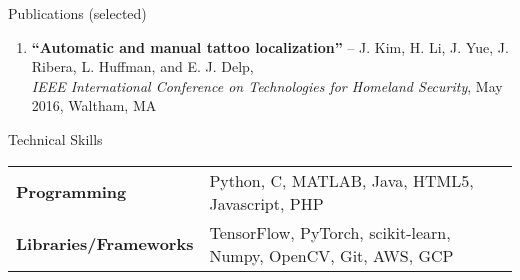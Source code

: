 \documentclass{resume} %
\begin{document}
\begin{rSection}{Publications (selected)}
\begin{enumerate}
\item 
\textbf{``Automatic and manual tattoo localization''} -- J. Kim, H. Li, J. Yue, J. Ribera, L. Huffman, and E. J. Delp, \\
		\emph{IEEE International Conference on Technologies for Homeland Security}, May 2016, Waltham, MA %
\end{enumerate}

\vspace{-5pt}

\end{rSection}


\begin{rSection}{Technical Skills}

\begin{tabular}{ @{} >{\bfseries}l @{\hspace{3ex}} l }
\textbf{Programming} & Python, C, MATLAB, Java, HTML5, Javascript, PHP \\
\textbf{Libraries/Frameworks} & TensorFlow, PyTorch, scikit-learn, Numpy, OpenCV, Git, AWS, GCP \\
\end{tabular}

\vspace{-1pt}

\end{rSection}
\end{document}
